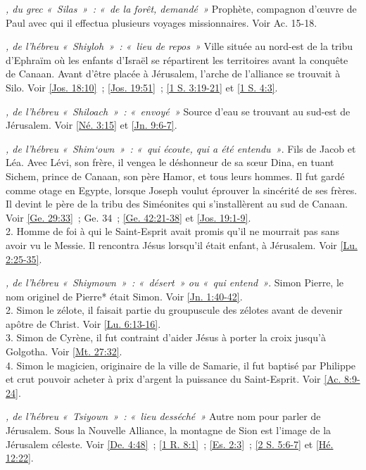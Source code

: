 \begin{multicols}{2}
\textit{, du grec «~Silas~»~: «~de la forêt, demandé~»}\newline
Prophète, compagnon d'œuvre de Paul avec qui il effectua plusieurs voyages missionnaires. Voir Ac. 15-18.

\textit{, de l'hébreu «~Shiyloh~»~: «~lieu de repos~»}\newline
Ville située au nord-est de la tribu d'Ephraïm où les enfants d'Israël se répartirent les territoires avant la conquête de Canaan. Avant d'être placée à Jérusalem, l'arche de l'alliance se trouvait à Silo. Voir \vref{Jos. 18:10}~; \vref{Jos. 19:51}~; \vref{1 S. 3:19-21} et \vref{1 S. 4:3}.

\textit{, de l'hébreu «~Shiloach~»~: «~envoyé~»}\newline
Source d'eau se trouvant au sud-est de Jérusalem. Voir \vref{Né. 3:15} et \vref{Jn. 9:6-7}.

\textit{, de l'hébreu «~Shim`own~»~: «~qui écoute, qui a été entendu~»}. Fils de Jacob et Léa. Avec Lévi, son frère, il vengea le déshonneur de sa sœur Dina, en tuant Sichem, prince de Canaan, son père Hamor, et tous leurs hommes. Il fut gardé comme otage en Egypte, lorsque Joseph voulut éprouver la sincérité de ses frères. Il devint le père de la tribu des Siméonites qui s'installèrent au sud de Canaan. Voir \vref{Ge. 29:33}~; Ge. 34~; \vref{Ge. 42:21-38} et \vref{Jos. 19:1-9}.
\\2. Homme de foi à qui le Saint-Esprit avait promis qu'il ne mourrait pas sans avoir vu le Messie. Il rencontra Jésus lorsqu'il était enfant, à Jérusalem. Voir \vref{Lu. 2:25-35}.

\textit{, de l'hébreu «~Shiymown~»~: «~désert~» ou «~qui entend~»}. Simon Pierre, le nom originel de Pierre* était Simon. Voir \vref{Jn. 1:40-42}.
\\2. Simon le zélote, il faisait partie du groupuscule des zélotes avant de devenir apôtre de Christ. Voir \vref{Lu. 6:13-16}.
\\3. Simon de Cyrène, il fut contraint d'aider Jésus à porter la croix jusqu'à Golgotha. Voir \vref{Mt. 27:32}.
\\4. Simon le magicien, originaire de la ville de Samarie, il fut baptisé par Philippe et crut pouvoir acheter à prix d'argent la puissance du Saint-Esprit. Voir \vref{Ac. 8:9-24}.

\textit{, de l'hébreu «~Tsiyown~»~: «~lieu desséché~»}\newline
Autre nom pour parler de Jérusalem. Sous la Nouvelle Alliance, la montagne de Sion est l'image de la Jérusalem céleste. Voir \vref{De. 4:48}~; \vref{1 R. 8:1}~; \vref{Es. 2:3}~; \vref{2 S. 5:6-7} et \vref{Hé. 12:22}.


\end{multicols}
